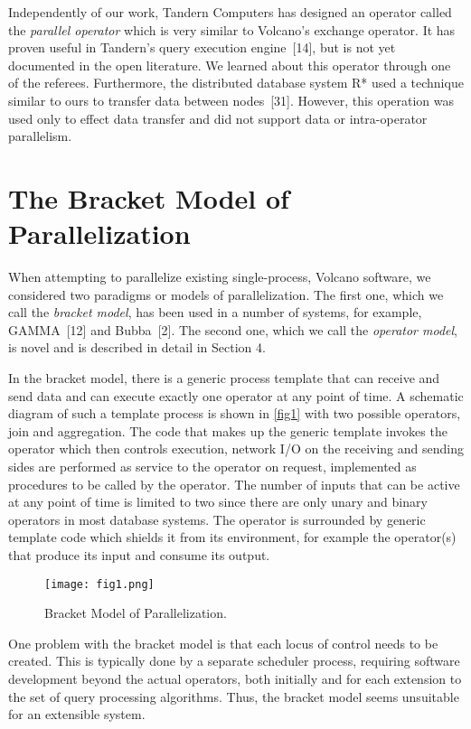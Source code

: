 \documentclass[a4paper,11pt,notitlepage,twoside,openright]{article}
\begin{document}
Independently of our work, Tandern Computers has
designed an operator called the \emph{parallel operator} which is
very similar to Volcano's exchange operator. It has proven
useful in Tandern's query execution engine~{[14]}, but is not
yet documented in the open literature. We learned about
this operator through one of the referees. Furthermore, the
distributed database system R* used a technique similar to
ours to transfer data between nodes~{[31]}. However, this
operation was used only to effect data transfer and did not
support data or intra-operator parallelism.

\section{The Bracket Model of Parallelization}

When attempting to parallelize existing single-process,
Volcano software, we considered two paradigms or models
of parallelization. The first one, which we call the \emph{bracket model},
has been used in a number of systems, for example,
GAMMA~{[12]} and Bubba~{[2]}. The second one, which we
call the \emph{operator model}, is novel and is described in detail
in Section 4.

In the bracket model, there is a generic process template
that can receive and send data and can execute
exactly one operator at any point of time. A schematic
diagram of such a template process is shown in \autoref{fig1}
with two possible operators, join and aggregation. The
code that makes up the generic template invokes the operator
which then controls execution, network I/O on the
receiving and sending sides are performed as service to the
operator on request, implemented as procedures to be called
by the operator. The number of inputs that can be active
at any point of time is limited to two since there are only
unary and binary operators in most database systems. The
operator is surrounded by generic template code which
shields it from its environment, for example the operator(s)
that produce its input and consume its output.

\begin{figure}
  \centering
  \texttt{[image: fig1.png]}
  \caption{Bracket Model of Parallelization.\label{fig1}}
\end{figure}

One problem with the bracket model is that each
locus of control needs to be created. This is typically done
by a separate scheduler process, requiring software development
beyond the actual operators, both initially and for each
extension to the set of query processing algorithms. Thus,
the bracket model seems unsuitable for an extensible system.
\end{document}
